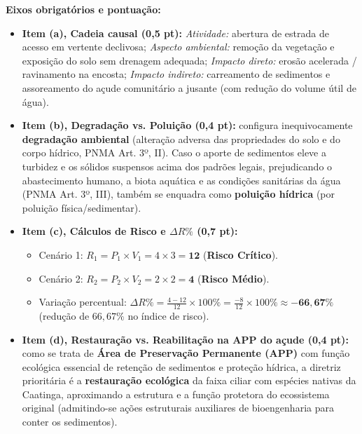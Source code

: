 \begin{boxGabarito}
\textbf{Eixos obrigatórios e pontuação:}
\begin{itemize}[leftmargin=1.5em, itemsep=2pt]
  \item \textbf{Item (a), Cadeia causal (0,5 pt):} \textit{Atividade:} abertura de estrada de acesso em vertente declivosa; \textit{Aspecto ambiental:} remoção da vegetação e exposição do solo sem drenagem adequada; \textit{Impacto direto:} erosão acelerada / ravinamento na encosta; \textit{Impacto indireto:} carreamento de sedimentos e assoreamento do açude comunitário a jusante (com redução do volume útil de água).
  \item \textbf{Item (b), Degradação vs. Poluição (0,4 pt):} configura inequivocamente \textbf{degradação ambiental} (alteração adversa das propriedades do solo e do corpo hídrico, PNMA Art. 3º, II). Caso o aporte de sedimentos eleve a turbidez e os sólidos suspensos acima dos padrões legais, prejudicando o abastecimento humano, a biota aquática e as condições sanitárias da água (PNMA Art. 3º, III), também se enquadra como \textbf{poluição hídrica} (por poluição física/sedimentar).
  \item \textbf{Item (c), Cálculos de Risco e $\Delta R\%$ (0,7 pt):}
  \begin{itemize}[leftmargin=1.3em, itemsep=1pt]
    \item Cenário 1: $R_1 = P_1 \times V_1 = 4 \times 3 = \mathbf{12}$ (\textbf{Risco Crítico}).
    \item Cenário 2: $R_2 = P_2 \times V_2 = 2 \times 2 = \mathbf{4}$ (\textbf{Risco Médio}).
    \item Variação percentual: $\Delta R\% = \frac{4 - 12}{12} \times 100\% = \frac{-8}{12} \times 100\% \approx \mathbf{-66,67\%}$ (redução de $66,67\%$ no índice de risco).
  \end{itemize}
  \item \textbf{Item (d), Restauração vs. Reabilitação na APP do açude (0,4 pt):} como se trata de \textbf{Área de Preservação Permanente (APP)} com função ecológica essencial de retenção de sedimentos e proteção hídrica, a diretriz prioritária é a \textbf{restauração ecológica} da faixa ciliar com espécies nativas da Caatinga, aproximando a estrutura e a função protetora do ecossistema original (admitindo-se ações estruturais auxiliares de bioengenharia para conter os sedimentos).
\end{itemize}
\end{boxGabarito}

